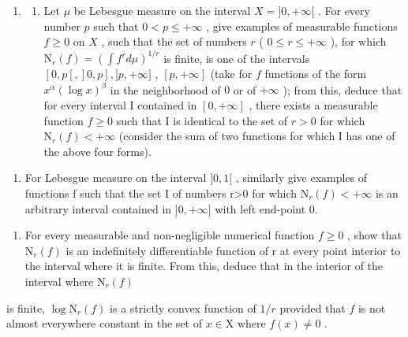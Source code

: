 \begin{enumerate}
\def\labelenumi{\arabic{enumi})}
\setcounter{enumi}{4}
\tightlist
\item
  \begin{enumerate}
  \def\labelenumii{\alph{enumii})}
  \tightlist
  \item
    Let \(\mu\) be Lebesgue measure on the interval \(X = ]0, +\infty[\) . For every number \(p\) such that \(0 < p \leqslant +\infty\) , give examples of measurable functions \(f \geqslant 0\) on \(X\) , such that the set of numbers \(r\) ( \(0 \leqslant r \leqslant +\infty\) ), for which \(\mathrm{N}_r(f) = (\int f^r d\mu)^{1/r}\) is finite, is one of the intervals \([0, p[, ]0, p], ]p, +\infty]\) , \([p, +\infty]\) (take for \(f\) functions of the form \(x^\alpha(\log x)^\beta\) in the neighborhood of \(0\) or of \(+\infty\) ); from this, deduce that for every interval I contained in \([0, +\infty]\) , there exists a measurable function \(f \geqslant 0\) such that I is identical to the set of \(r > 0\) for which \(\mathrm{N}_r(f) < +\infty\) (consider the sum of two functions for which I has one of the above four forms).
  \end{enumerate}
\end{enumerate}

\begin{enumerate}
\def\labelenumi{\alph{enumi})}
\setcounter{enumi}{1}
\tightlist
\item
  For Lebesgue measure on the interval \(]0,1[\) , similarly give examples of functions f such that the set I of numbers r\textgreater0 for which \(\mathrm{N}_{r}(f)<+\infty\) is an arbitrary interval contained in \(]0,+\infty]\) with left end-point 0.
\end{enumerate}

\begin{enumerate}
\def\labelenumi{\arabic{enumi})}
\setcounter{enumi}{5}
\tightlist
\item
  For every measurable and non-negligible numerical function \(f \geqslant 0\) , show that \(\mathrm{N}_{r}(f)\) is an indefinitely differentiable function of r at every point interior to the interval where it is finite. From this, deduce that in the interior of the interval where \(\mathrm{N}_{r}(f)\)
\end{enumerate}

is finite, \(\log \mathrm{N}_r(f)\) is a strictly convex function of \(1 / r\) provided that \(f\) is not almost everywhere constant in the set of \(x\in \mathrm{X}\) where \(f(x)\neq 0\) .


